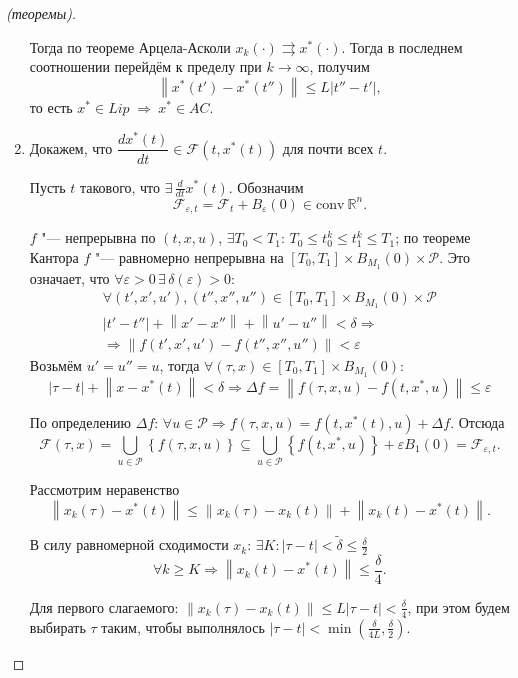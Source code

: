 \documentclass[12pt, a4paper]{article}
\theoremstyle{rusdef}
\newcommand\abs[1]{\left\lvert #1 \right\rvert} %
\newcommand{\R}{\ensuremath{\mathbb{R}}} %
\renewcommand{\P}{\mathscr{P}} %
\newcommand{\norm}[1]{\left\lVert #1 \right\rVert} %
\DeclareMathOperator*{\thus}{\Rightarrow} %
\begin{document}
\begin{proof}[(теоремы)]
\begin{enumerate}
    Тогда по теореме Арцела-Асколи $x_k(\cdot) \rightrightarrows x^*(\cdot)$.
    Тогда в последнем соотношении перейдём к пределу при $k \to \infty$, получим
    \[
      \norm{x^*(t') - x^*(t'')} \leqslant L \abs{t'' - t'},
    \]
    то есть $x^* \in Lip \;\thus\: x^* \in AC$.

    \item Докажем, что $\dfrac{d x^*(t)}{dt} \in \mathcal{F}(t, x^*(t))$ для почти всех $t$.
    
    Пусть $t$ такового, что $\exists\, \frac{d}{dt}x^*(t)$. Обозначим
    \[
      \mathcal{F}_{\varepsilon, t} = \mathcal{F}_t + B_{\varepsilon}(0) \in \mathrm{conv}~\R^n.
    \]

    $f$ "--- непрерывна по $(t, x, u)$, $\exists T_0 < T_1$: $T_0 \leqslant t_0^k \leqslant t_1^k \leqslant T_1$; по теореме Кантора $f$ "--- равномерно непрерывна на $[T_0, T_1] \times B_{M_1}(0) \times \P$. Это означает, что $\forall \varepsilon > 0 \,\exists\, \delta(\varepsilon) > 0 \colon$
    \begin{gather*}
      \forall (t', x', u'), (t'', x'', u'') \in [T_0, T_1] \times B_{M_1}(0) \times \P\\
      \abs{t' - t''} + \norm{x' - x''} + \norm{u' - u''} < \delta \thus \\
      \thus \norm{f(t', x', u') - f(t'', x'', u'')} < \varepsilon
    \end{gather*}
    Возьмём $u' = u'' = u$, тогда $\forall (\tau, x) \in [T_0, T_1] \times B_{M_1}(0) \colon$
    \[
      \abs{\tau - t} + \norm{x - x^*(t)} < \delta \thus \Delta f = \norm{f(\tau, x, u) - f(t, x^*, u)} \leqslant \varepsilon
    \]
    
    По определению $\Delta f$: $\forall u \in \P \thus  f(\tau, x, u) = f(t, x^*(t), u) + \Delta f$. Отсюда
  \[
    \mathcal{F}(\tau, x) = \bigcup\limits_{u \in \P} \left\{ f(\tau,x,u) \right\} \subseteq \bigcup\limits_{u \in \P} \left\{ f(t,x^*,u) \right\} + \varepsilon B_1(0) = \mathcal{F}_{\varepsilon, t}.
  \]

  Рассмотрим неравенство 
  \[
    \norm{x_k(\tau) - x^*(t)} \leqslant \norm{x_k(\tau) - x_k(t)} + \norm{x_k(t) - x^*(t)}.
  \]

  В силу равномерной сходимости $x_k$: $\exists K \colon \abs{\tau - t} < \tilde{\delta} \leqslant \frac{\delta}{2}$ 
  \[
    \forall k \geqslant K \thus \norm{x_k(t) - x^*(t)} \leqslant \frac{\delta}{4}.
  \]

  Для первого слагаемого: $\norm{x_k(\tau) - x_k(t)} \leqslant L \abs{\tau - t} < \frac{\delta}{4}$, при этом будем выбирать $\tau$ таким, чтобы выполнялось $\abs{\tau - t} < \min(\frac{\delta}{4L}, \frac{\delta}{2})$.


\end{enumerate}
\end{proof}
\end{document}
